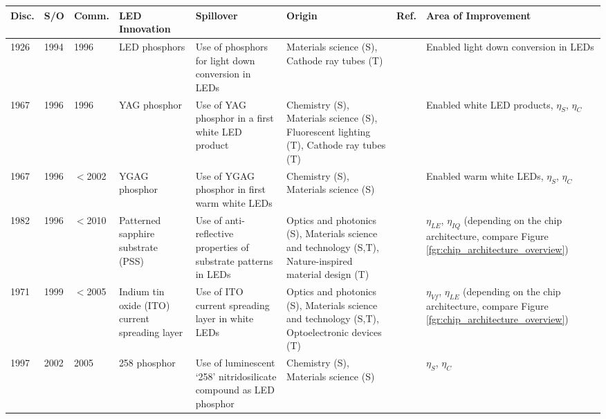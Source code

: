 \documentclass[journal=jacsat,manuscript=article]{achemso}
\begin{document}
\clearpage
\begin{table}[h!]
    \tiny
    \centering
    \begin{tabularx}{\textwidth}{|l|l|l|X|X|X|l|X|}
    \hline
        \textbf{Disc.} & \textbf{S/O} & \textbf{Comm.} & \textbf{LED Innovation} & \textbf{Spillover} & \textbf{Origin} & \textbf{Ref.} & \textbf{Area of Improvement} \\ \hline
        1926 & 1994 & 1996 & LED phosphors & Use of phosphors for light down conversion in LEDs & Materials science (S), Cathode ray tubes (T) & \cite{bright1972electric}\cite{shimizu1994sheet}\cite{cho2017white} & Enabled light down conversion in LEDs \\ \hline
        1967 & 1996 & 1996 & YAG phosphor & Use of YAG phosphor in a first white LED product & Chemistry (S), Materials science (S), Fluorescent lighting (T), Cathode ray tubes (T) & \cite{blasse1967new}\cite{bando1996}\cite{bando1998development}\cite{shimizu1999light}\cite{cho2017white} & Enabled white LED products, $\eta_S$, $\eta_C$ \\ \hline
        1967 & 1996 & $<$2002 & YGAG phosphor & Use of YGAG phosphor in first warm white LEDs & Chemistry (S), Materials science (S) &\cite{holloway1969optical}\cite{bando1998development}\cite{shimizu1999light}\cite{Mueller2002} & Enabled warm white LEDs, $\eta_S$, $\eta_C$ \\ \hline
        1982 & 1996 & $<$2010 & Patterned sapphire substrate (PSS) & Use of anti-reflective properties of substrate patterns in LEDs & Optics and photonics (S), Materials science and technology (S,T), Nature-inspired material design (T) &\cite{moharam1982diffraction}\cite{krames1998ordered}\cite{feezell2018invention}\cite{Narukawa_2010} & $\eta_{LE}$, $\eta_{IQ}$ (depending on the chip architecture, compare Figure \ref{fgr:chip_architecture_overview})\\ \hline
        1971 & 1999 & $<$2005 & Indium tin oxide (ITO) current spreading layer & Use of ITO current spreading layer in white LEDs & Optics and photonics (S), Materials science and technology (S,T), Optoelectronic devices (T) & \cite{vossen1971rf}\cite{fraser1972highly}\cite{margalith1999indium} & $\eta_{Vf}$, $\eta_{LE}$ (depending on the chip architecture, compare Figure \ref{fgr:chip_architecture_overview}) \\ \hline
        1997 & 2002 & 2005 & 258 phosphor & Use of luminescent ‘258’ nitridosilicate compound as LED phosphor & Chemistry (S), Materials science (S) &\cite{Huppertz1997}\cite{mueller2004phosphor}\cite{MuellerMach2005} & $\eta_S$, $\eta_C$ \\ \hline

\end{tabularx}
\end{table}
\end{document}
